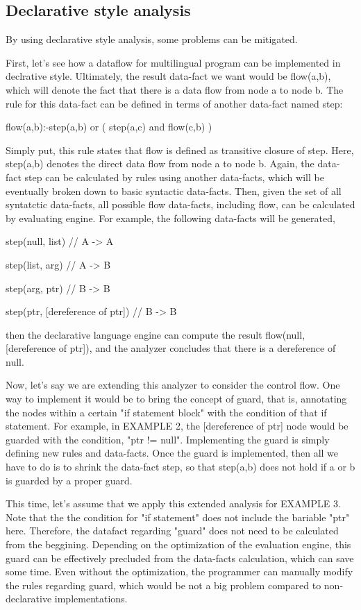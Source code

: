 \subsection{Declarative style analysis}

By using declarative style analysis, some problems can be mitigated.

First, let's see how a dataflow for multilingual program can be implemented in
declrative style. Ultimately, the result data-fact we want would be flow(a,b),
which will denote the fact that there is a data flow from node a to node b. The
rule for this data-fact can be defined in terms of another data-fact named
step:

flow(a,b):-step(a,b) or ( step(a,c) and flow(c,b) )

Simply put, this rule states that flow is defined as transitive closure of step.
Here, step(a,b) denotes the direct data flow from node a to node b. Again, the
data-fact step can be calculated by rules using another data-facts, which will
be eventually broken down to basic syntactic data-facts. Then, given the set of
all syntatctic data-facts, all possible flow data-facts, including flow, can be
calculated by evaluating engine. For example, the following data-facts will be
generated,

step(null, list) // A -> A

step(list, arg) // A -> B

step(arg, ptr) // B -> B

step(ptr, [dereference of ptr]) // B -> B

then the declarative language engine can compute the result flow(null,
[dereference of ptr]), and the analyzer concludes that there is a dereference
of null.

Now, let's say we are extending this analyzer to consider the control flow.
One way to implement it would be to bring the concept of guard, that is,
annotating the nodes within a certain "if statement block" with the condition
of that if statement.  For example, in EXAMPLE 2, the [dereference of ptr] node
would be guarded with the condition, "ptr != null".  Implementing the guard is
simply defining new rules and data-facts. Once the guard is implemented, then
all we have to do is to shrink the data-fact step, so that step(a,b) does not
hold if a or b is guarded by a proper guard.

This time, let's assume that we apply this extended analysis for EXAMPLE 3.
Note that the the condition for "if statement" does not include the bariable
"ptr" here.  Therefore, the datafact regarding "guard" does not need to be
calculated from the beggining. Depending on the optimization of the evaluation
engine, this guard can be effectively precluded from the data-facts
calculation, which can save some time.  Even without the optimization, the
programmer can manually modify the rules regarding guard, which would be not a
big problem compared to non-declarative implementations.

